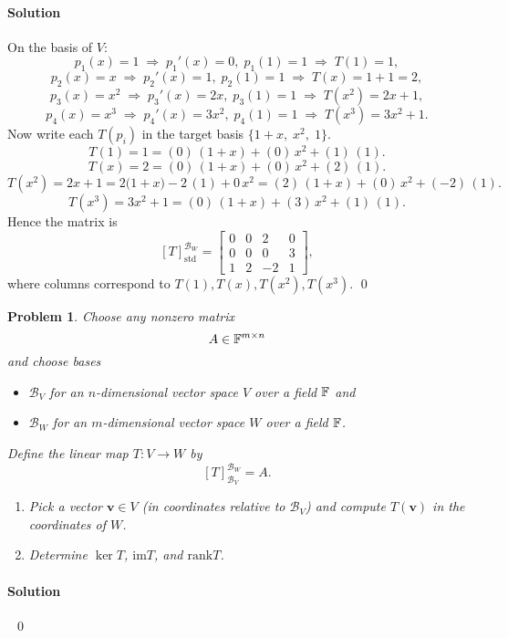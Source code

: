 \documentclass[11pt,openany]{article}
\newtheorem{problem}{Problem}
\renewcommand{\vec}[1]{\mathbf{#1}}
\newenvironment{solution}{\paragraph{\color{magenta}Solution}}{}
\begin{document}
\begin{solution}\color{white}
	On the basis of $V$:
	\[
	p_1(x)=1\;\Rightarrow\;p_1'(x)=0,\;p_1(1)=1\;\Longrightarrow\;T(1)=1,
	\]
	\[
	p_2(x)=x\;\Rightarrow\;p_2'(x)=1,\;p_2(1)=1\;\Longrightarrow\;T(x)=1+1=2,
	\]
	\[
	p_3(x)=x^2\;\Rightarrow\;p_3'(x)=2x,\;p_3(1)=1\;\Longrightarrow\;T(x^2)=2x+1,
	\]
	\[
	p_4(x)=x^3\;\Rightarrow\;p_4'(x)=3x^2,\;p_4(1)=1\;\Longrightarrow\;T(x^3)=3x^2+1.
	\]
	Now write each $T(p_i)$ in the target basis $\{1+x,\;x^2,\;1\}$.
	\[
	T(1)=1 = (0)\,(1+x) + (0)\,x^2 + (1)\,(1).
	\]
	\[
	T(x)=2 = (0)\,(1+x) + (0)\,x^2 + (2)\,(1).
	\]
	\[
	T(x^2)=2x+1 = 2\bigl(1+x\bigr) -2\,(1) +0\,x^2
	= (2)\,(1+x) + (0)\,x^2 + (-2)\,(1).
	\]
	\[
	T(x^3)=3x^2+1 = (0)\,(1+x) + (3)\,x^2 + (1)\,(1).
	\]
	Hence the matrix is
	\[
	[T]_{\text{std}}^{\mathcal{B}_W}
	= \begin{bmatrix}
		0 & 0 & 2 & 0\\
		0 & 0 & 0 & 3\\
		1 & 2 & -2 & 1
	\end{bmatrix},
	\]
	where columns correspond to $T(1),T(x),T(x^2),T(x^3)$.
	\color{black}\vfill\hfill\qed
\end{solution}

\newpage
\begin{problem}
Choose any nonzero matrix \[
A\in\mathbb{F}^{m\times n}
\] and choose bases \begin{itemize}
	\item $\mathcal{B}_V$ for an $n$-dimensional vector space $V$ over a field $\mathbb{F}$ and
	\item $\mathcal{B}_W$ for an $m$-dimensional vector space $W$ over a field $\mathbb{F}$.
\end{itemize} Define the linear map $T:V\to W$ by \[
[T]_{\mathcal{B}_V}^{\mathcal{B}_W}=A.
\] \begin{enumerate}
	\item Pick a vector $\vec{v}\in V$ (in coordinates relative to $\mathcal{B}_V$) and compute $T(\vec{v})$ in the coordinates of $W$.
	\item Determine $\ker T$, $\mathrm{im} T$, and $\mathrm{rank} T$.
\end{enumerate}
\end{problem}
\begin{solution}
\ \vfill\hfill\qed
\end{solution}

\newpage
{}
\end{document}
